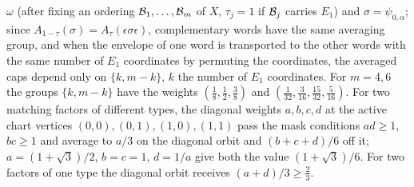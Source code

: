\begin{lemma}
\begin{enumerate}[label=(\alph*)]
 $\omega$ (after fixing an ordering $\mathcal B_1,\dots,\mathcal B_m$ of $X$, $\tau_j=1$ if $\mathcal B_j$ carries $E_1$) and $\sigma=\psi_{0,\alpha}$;
 since $A_{1-\tau}(\sigma)=A_\tau(\epsilon\sigma\epsilon)$, complementary words have the
 same averaging group, and when the envelope of one word is transported to the
 other words with the same number of $E_1$ coordinates by permuting the
 coordinates, the averaged caps depend only on $\{k,m-k\}$, $k$ the number of $E_1$
 coordinates. For $m=4,6$ the groups $\{k,m-k\}$ have the weights
 $(\frac18,\frac12,\frac38)$ and $(\frac1{32},\frac3{16},\frac{15}{32},\frac5{16})$. For
 two matching factors of different types, the diagonal weights $a,b,c,d$ at the
 active chart vertices $(0,0),(0,1),(1,0),(1,1)$ pass the mask conditions
 $ad\ge1$, $bc\ge1$ and average to $a/3$ on the diagonal orbit and $(b+c+d)/6$ off
 it; $a=(1+\sqrt3)/2$, $b=c=1$, $d=1/a$ give both the value $(1+\sqrt3)/6$. For two
 factors of one type the diagonal orbit receives $(a+d)/3\ge\frac23$.
\end{enumerate}
\end{lemma}

